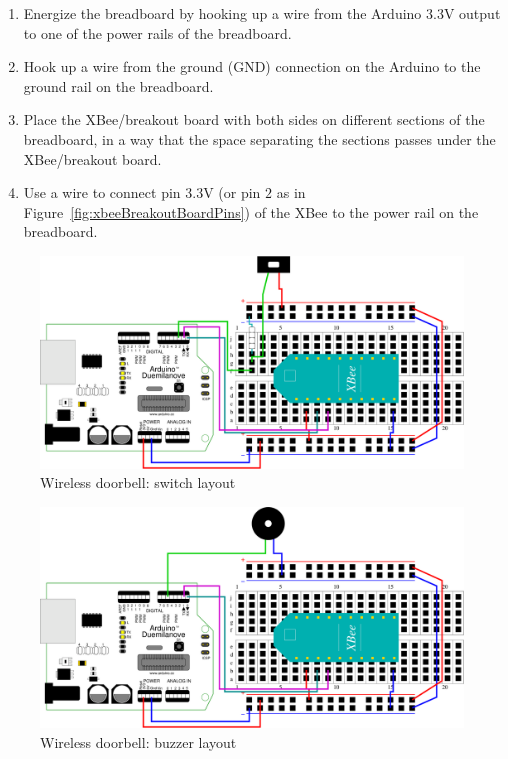\begin{enumerate}
  \item Energize the breadboard by hooking up a {\color{red}{red}} wire from the Arduino $3.3$V output to one of the power rails of the breadboard.
  \item Hook up a {\color{blue}{blue}} wire from the ground (GND) connection on the Arduino to the ground rail on the breadboard.
  \item Place the XBee/breakout board with both sides on different sections of the breadboard, in a way that the space separating the sections passes under the XBee/breakout board.
  \item Use a {\color{red}{red}} wire to connect pin $3.3$V (or pin $2$ as in Figure~\ref{fig:xbeeBreakoutBoardPins}) of the XBee to the power rail on the breadboard.
\end{enumerate}


\begin{figure}[htbp]
  \centering
  \includegraphics[width=\linewidth]{figures/doorbellSwitch.eps}
  \caption{Wireless doorbell: switch layout
  \label{fig:wirelessDoorbellSwitch}}
\end{figure}

\begin{figure}[htbp]
  \centering
  \includegraphics[width=\linewidth]{figures/doorbellBuzzer.eps}
  \caption{Wireless doorbell: buzzer layout
  \label{fig:wirelessDoorbellBuzzer}}
\end{figure}